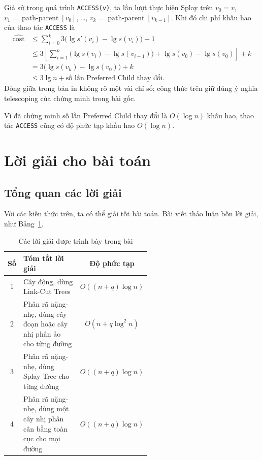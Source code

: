 \documentclass[11pt]{article}
\begin{document}
Giả sử trong quá trình \texttt{ACCESS(v)}, ta lần lượt thực hiện Splay trên
$v_0=v$, $v_1=\operatorname{path\mbox{-}parent}[v_0]$, \ldots,
$v_k=\operatorname{path\mbox{-}parent}[v_{k-1}]$. Khi đó chi phí khấu hao của
thao tác \texttt{ACCESS} là
\[
\begin{aligned}
\widehat{\operatorname{cost}}
&\le \sum_{i=0}^{k} 3\bigl(\lg s'(v_i)-\lg s(v_i)\bigr)+1 \\
&\le
3\left[
\sum_{i=1}^{k}\bigl(\lg s(v_i)-\lg s(v_{i-1})\bigr)
+ \lg s(v_0)-\lg s(v_0)
\right]+k \\
&= 3\bigl(\lg s(v_k)-\lg s(v_0)\bigr)+k \\
&\le 3\lg n + \text{số lần Preferred Child thay đổi}.
\end{aligned}
\]
Dòng giữa trong bản in không rõ một vài chỉ số; công thức trên giữ đúng ý nghĩa
telescoping của chứng minh trong bài gốc.

Vì đã chứng minh số lần Preferred Child thay đổi là $O(\log n)$ khấu hao, thao
tác \texttt{ACCESS} cũng có độ phức tạp khấu hao $O(\log n)$.

\section{Lời giải cho bài toán}

\subsection{Tổng quan các lời giải}

Với các kiến thức trên, ta có thể giải tốt bài toán. Bài viết thảo luận bốn
lời giải, như Bảng~\ref{tab:solutions}.

\begin{table}[htbp]
\centering
\begin{tabular}{cp{0.56\linewidth}c}
\hline
\textbf{Số} & \textbf{Tóm tắt lời giải} & \textbf{Độ phức tạp} \\
\hline
1 & Cây động, dùng Link-Cut Trees & $O((n+q)\log n)$ \\
2 & Phân rã nặng-nhẹ, dùng cây đoạn hoặc cây nhị phân ảo cho từng đường &
$O(n+q\log^2 n)$ \\
3 & Phân rã nặng-nhẹ, dùng Splay Tree cho từng đường & $O((n+q)\log n)$ \\
4 & Phân rã nặng-nhẹ, dùng một cây nhị phân cân bằng toàn cục cho mọi đường &
$O((n+q)\log n)$ \\
\hline
\end{tabular}
\caption{Các lời giải được trình bày trong bài}
\label{tab:solutions}
\end{table}
\end{document}
